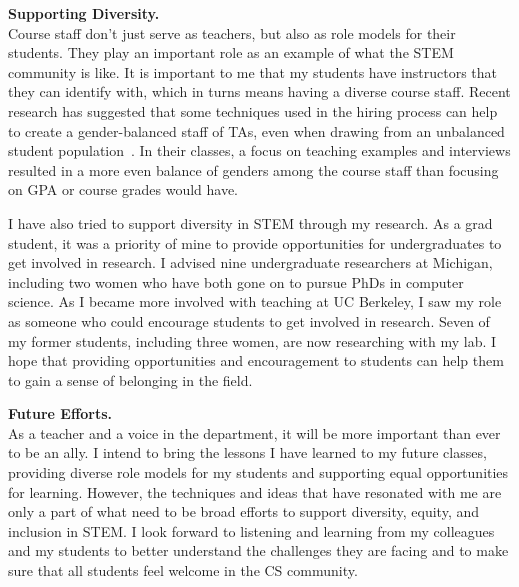 \documentclass[11pt]{article} %
\begin{document}

\medskip
\textbf{\textsf{\large Supporting Diversity.}}\\
Course staff don't just serve as teachers, but also as role models for their
students. They play an important role as an example of what the STEM community
is like.
%
It is important to me that my students have instructors that they can identify
with, which in turns means having a diverse course staff.
%
Recent research has suggested that some techniques used in the hiring process
can help to create a gender-balanced staff of TAs, even when drawing from an
unbalanced student population~\footnotemark{}. In their classes, a focus on
teaching examples and interviews resulted in a more even balance of genders
among the course staff than focusing on GPA or course grades would have.


I have also tried to support diversity in STEM through my research.
%
As a grad student, it was a priority of mine to provide opportunities for
undergraduates to get involved in research. I advised nine undergraduate
researchers at Michigan, including two women who have both gone on to
pursue PhDs in computer science.
%
As I became more involved with teaching at UC Berkeley, I saw my role as
someone who could encourage students to get involved in research. Seven of my
former students, including three women, are now researching with my lab.
%
I hope that providing opportunities and encouragement to students can help them
to gain  a sense of belonging in  the field.

\medskip
\textbf{\textsf{\large Future Efforts.}}\\
As a teacher and a voice in the department, it will be more important than ever
to be an ally. I intend to bring the lessons I have learned to my future
classes, providing diverse role models for my students and supporting equal
opportunities for learning. However, the techniques and ideas that have
resonated with me are only a part of what need to be broad efforts to support
diversity, equity, and inclusion in STEM. I look forward to
listening and learning from my colleagues and my students to better understand
the challenges they are facing and to make sure that all students feel welcome
in the CS community.
\end{document}
